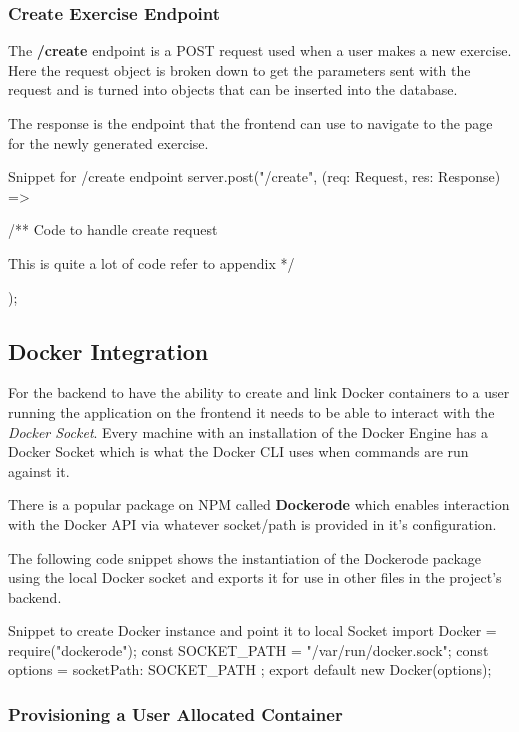 \subsubsection{Create Exercise Endpoint}

The \textbf{/create} endpoint is a POST request used when a user makes a new exercise. Here the request object is broken down to get the parameters sent with the request and is turned into objects that can be inserted into the database.

The response is the endpoint that the frontend can use to navigate to the page for the newly generated exercise.

\begin{sexylisting}{Snippet for /create endpoint}
server.post("/create", (req: Request, res: Response) => {
    /**
        Code to handle create request

        This is quite a lot of code refer to appendix %
    */
});
\end{sexylisting}

\subsection{Docker Integration}

For the backend to have the ability to create and link Docker containers to a user running the application on the frontend it needs to be able to interact with the \textit{Docker Socket}. Every machine with an installation of the Docker Engine has a Docker Socket which is what the Docker CLI uses when commands are run against it.

There is a popular package on NPM called \textbf{Dockerode} \cite{dockerode} which enables interaction with the Docker API via whatever socket/path is provided in it's configuration.

The following code snippet shows the instantiation of the Dockerode package using the local Docker socket and exports it for use in other files in the project's backend.

\begin{sexylisting}{Snippet to create Docker instance and point it to local Socket}    
import Docker = require("dockerode");
const SOCKET_PATH = "/var/run/docker.sock";
const options = { socketPath: SOCKET_PATH };
export default new Docker(options);
\end{sexylisting}

\subsubsection{Provisioning a User Allocated Container}

